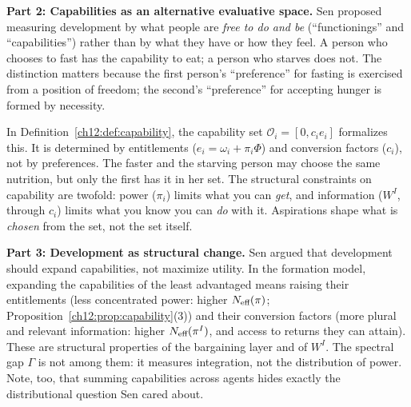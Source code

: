 \documentclass[../structural_economics_book.tex]{subfiles}
\begin{document}
\textbf{Part 2: Capabilities as an alternative evaluative space.} Sen proposed measuring development by what people are \textit{free to do and be} (``functionings'' and ``capabilities'') rather than by what they have or how they feel. A person who chooses to fast has the capability to eat; a person who starves does not. The distinction matters because the first person's ``preference'' for fasting is exercised from a position of freedom; the second's ``preference'' for accepting hunger is formed by necessity.

In Definition~\ref{ch12:def:capability}, the capability set $\mathcal{O}_i = [0, c_i e_i]$ formalizes this. It is determined by entitlements ($e_i = \omega_i + \pi_i\Phi$) and conversion factors ($c_i$), not by preferences. The faster and the starving person may choose the same nutrition, but only the first has it in her set. The structural constraints on capability are twofold: power ($\pi_i$) limits what you can \textit{get}, and information ($W^I$, through $c_i$) limits what you know you can \textit{do} with it. Aspirations shape what is \textit{chosen} from the set, not the set itself.

\textbf{Part 3: Development as structural change.} Sen argued that development should expand capabilities, not maximize utility. In the formation model, expanding the capabilities of the least advantaged means raising their entitlements (less concentrated power: higher $N_{\text{eff}}(\pi)$; Proposition~\ref{ch12:prop:capability}(3)) and their conversion factors (more plural and relevant information: higher $N_{\text{eff}}(\pi^I)$, and access to returns they can attain). These are structural properties of the bargaining layer and of $W^I$. The spectral gap $\Gamma$ is not among them: it measures integration, not the distribution of power. Note, too, that summing capabilities across agents hides exactly the distributional question Sen cared about.
\end{document}
